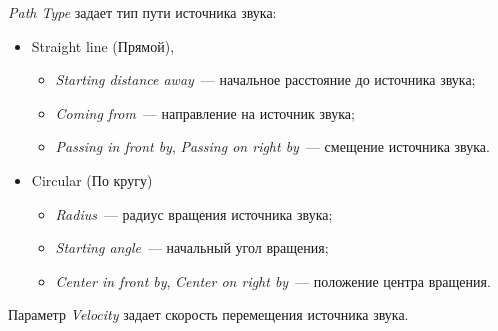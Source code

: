 \documentclass[oneside, final, 14pt]{extreport}
\begin{document}
\textit{Path Type} задает тип пути источника звука:
\begin{itemize}
  \item Straight line (Прямой),
  \begin{itemize}
    \item \textit{Starting distance away}~--- начальное расстояние до источника звука;
    \item \textit{Coming from}~--- направление на источник звука;
    \item \textit{Passing in front by}, \textit{Passing on right by}~--- смещение источника звука.
  \end{itemize}
  \item Circular (По кругу)
  \begin{itemize}
    \item \textit{Radius}~--- радиус вращения источника звука;
    \item \textit{Starting angle}~--- начальный угол вращения;
    \item \textit{Center in front by}, \textit{Center on right by}~--- положение центра вращения.
  \end{itemize}
\end{itemize}

Параметр \textit{Velocity} задает скорость перемещения источника звука.
\end{document}
